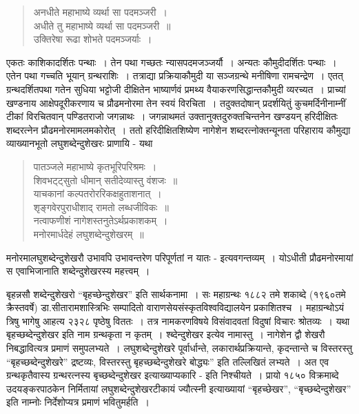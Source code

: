 {\begin{verse}
अनधीते महाभाष्ये व्यर्था सा पदमञ्जरी~। \\
अधीते तु महाभाष्ये व्यर्था सा पदमञ्जरी~॥\\
उक्तिरेषा रूढा शोभते पदमञ्जर्याः~। 
\end{verse}

एकतः काशिकादर्शितः पन्थाः~। तेन पथा गच्छतः न्यासपदमजञ्जर्यौ~। अन्यतः कौमुदीदर्शितः पन्थाः~। एतेन पथा गच्चति भूयान् ग्रन्थराशिः~। तत्राद्या प्रक्रियाकौमुदी या सञ्जग्रन्थे मनीषिणा रामचन्द्रेण~। एतत् ग्रन्थदर्शितपथा गतेन सुधिया भट्टोजी दीक्षितेन भाष्यार्णवं प्रमथ्य वैयाकरणसिद्धान्तकौमुदी व्यरच्यत~। प्राच्यां खण्डनाय आक्षेपदूरीकरणाय च प्रौढमनोरमा तेन स्वयं विरचिता~। तदुक्तदोषान् प्रदर्शयितुं कुचमर्दिनीनाम्नीं टीकां विरचितवान् पण्डितराजो जगन्नाथः~। जगन्नाथमतं उक्तानुक्तदुरुक्तचिन्तनेन खण्डयन् हरिदीक्षितः शब्दरत्नेन प्रौढमनोरमामलमकोरोत्~। ततो हरिदीक्षितशिष्येण नागेशेन शब्दरत्नोक्तन्यूनता परिहाराय कौमुद्या व्याख्यानभूतो लघुशब्देन्दुशेखरः प्राणायि - यथा 

\begin{verse}
पातञ्जले महाभाष्ये कृतभूरिपरिश्रमः~। \\
शिवभट्ट्सुतो धीमान् सतीदेव्यास्तु वंशजः~॥\\
याचकानां कल्पतरोररिकक्षहुताशनात्~। \\
शृङ्गवेरपुराधीशाद् रामतो लब्धजीविकः~॥\\
नत्वाफणीशं नागेशस्तनुतेऽर्थप्रकाशकम्~। \\
मनोरमार्धदेहं लघुशब्देन्दुशेखरम्~॥
\end{verse}

मनोरमालघुशब्देन्दुशेखरौ उभावपि उभावन्तरेण परिपूर्णतां न यातः - इत्यवगन्तव्यम्~। योऽधीती प्रौढमनोरमायां स एवाभिजानाति शब्देन्दुशेखरस्य महत्त्वम्~। 

बृहन्नसौ शब्देन्दुशेखरो “बृहच्छेन्दुशेखर” इति सार्थकनामा~। सः महाग्रन्थः १८८२ तमे शकाब्दे (१९६०तमे क्रैस्तवर्षे) डा.सीतारामशास्त्रिभिः सम्पादितो वाराणसेयसंस्कृतविश्वविद्यालयेन प्रकाशितश्च~। महाग्रन्थोऽयं त्रिषु भागेषु आहत्य २३२८ पृष्ठेषु विततः~। तत्र नामकरणविषये विसंवादवतां विदुषां विचारः श्रोतव्यः~। यथा बृहच्छब्देन्दुशेखर इति नाम ग्रन्थकृता न कृतम्~। श्ब्देन्दुशेखर इत्येव नामास्तु~। नागेशेन द्वौ शेखरौ निबद्धावित्यत्र प्रमाणं समुपलभ्यते~। लघुशब्देन्दुशेखरे पूर्वार्धान्ते, लकारार्थप्रक्रियान्ते, कृदन्तान्ते च विस्तरस्तु “बृहच्छब्देन्दुशेखरे” द्रष्टव्यः, विस्तरस्तु बृहच्छब्देन्दुशेखरे बोद्ध्यः” इति तल्लिखितं लभ्यते~। अत एव ग्रन्थकृतैवास्य ग्रन्थरत्नस्य बृच्छब्देन्दुशेखर इत्याख्याप्यकारि - इति निश्चीयते~। प्रायो १८५० विक्रमाब्दे उदयङ्करपाठकेन निर्मितायां लघुशब्देन्दुशेखरटीकायं ज्यौत्स्नी इत्याख्यायां “बृहच्छेखर”, “बृच्छब्देन्दुशेखर” इति नाम्नोः निर्देशोप्यत्र प्रमाणं भवितुमर्हति~। 

}
